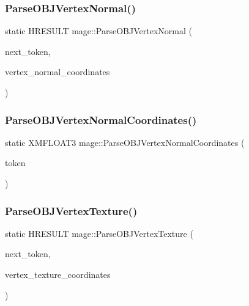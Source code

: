 \hypertarget{namespacemage_a3d0761a3accda925b303dd7d0889caac}{}\label{namespacemage_a3d0761a3accda925b303dd7d0889caac} 
\subsubsection{\texorpdfstring{Parse\+O\+B\+J\+Vertex\+Normal()}{ParseOBJVertexNormal()}}
{\footnotesize\ttfamily static H\+R\+E\+S\+U\+LT mage\+::\+Parse\+O\+B\+J\+Vertex\+Normal (\begin{DoxyParamCaption}\item[{char $\ast$$\ast$}]{next\+\_\+token,  }\item[{vector$<$ X\+M\+F\+L\+O\+A\+T3 $>$ \&}]{vertex\+\_\+normal\+\_\+coordinates }\end{DoxyParamCaption})\hspace{0.3cm}{\ttfamily [static]}}

\hypertarget{namespacemage_a1c9ffc0af89d5d85505557864525e617}{}\label{namespacemage_a1c9ffc0af89d5d85505557864525e617} 
\subsubsection{\texorpdfstring{Parse\+O\+B\+J\+Vertex\+Normal\+Coordinates()}{ParseOBJVertexNormalCoordinates()}}
{\footnotesize\ttfamily static X\+M\+F\+L\+O\+A\+T3 mage\+::\+Parse\+O\+B\+J\+Vertex\+Normal\+Coordinates (\begin{DoxyParamCaption}\item[{const char $\ast$}]{token }\end{DoxyParamCaption})\hspace{0.3cm}{\ttfamily [static]}}

\hypertarget{namespacemage_a8ffd4094ac940ff129fccb6d77c1f353}{}\label{namespacemage_a8ffd4094ac940ff129fccb6d77c1f353} 
\subsubsection{\texorpdfstring{Parse\+O\+B\+J\+Vertex\+Texture()}{ParseOBJVertexTexture()}}
{\footnotesize\ttfamily static H\+R\+E\+S\+U\+LT mage\+::\+Parse\+O\+B\+J\+Vertex\+Texture (\begin{DoxyParamCaption}\item[{char $\ast$$\ast$}]{next\+\_\+token,  }\item[{vector$<$ X\+M\+F\+L\+O\+A\+T2 $>$ \&}]{vertex\+\_\+texture\+\_\+coordinates }\end{DoxyParamCaption})\hspace{0.3cm}{\ttfamily [static]}}

